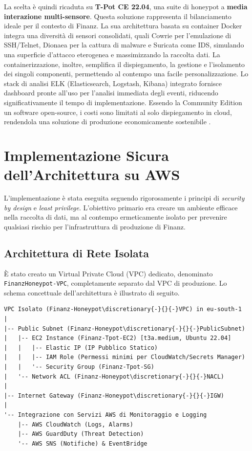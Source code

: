 La scelta è quindi ricaduta su \textbf{T-Pot CE 22.04}, una suite di honeypot a \textbf{media interazione multi-sensore}. Questa soluzione rappresenta il bilanciamento ideale per il contesto di Finanz. La sua architettura basata su container Docker integra una diversità di sensori consolidati, quali Cowrie per l'emulazione di SSH/Telnet, Dionaea per la cattura di malware e Suricata come IDS, simulando una superficie d'attacco eterogenea e massimizzando la raccolta dati. La containerizzazione, inoltre, semplifica il dispiegamento, la gestione e l'isolamento dei singoli componenti, permettendo al contempo una facile personalizzazione. Lo stack di analisi ELK (Elasticsearch, Logstash, Kibana) integrato fornisce dashboard pronte all'uso per l'analisi immediata degli eventi, riducendo significativamente il tempo di implementazione. Essendo la Community Edition un software open-source, i costi sono limitati al solo dispiegamento in cloud, rendendola una soluzione di produzione economicamente sostenibile \cite{proofpoint2024}.

\section{Implementazione Sicura dell'Architettura su AWS}
\label{sec:implementazione_sicura_aws}

L'implementazione è stata eseguita seguendo rigorosamente i principi di \textit{security by design} e \textit{least privilege}. L'obiettivo primario era creare un ambiente efficace nella raccolta di dati, ma al contempo ermeticamente isolato per prevenire qualsiasi rischio per l'infrastruttura di produzione di Finanz.

\subsection{Architettura di Rete Isolata}
È stato creato un Virtual Private Cloud (VPC) dedicato, denominato \texttt{Finanz\discretionary{-}{}{-}Honeypot\discretionary{-}{}{-}-VPC}, completamente separato dal VPC di produzione.
Lo schema concettuale dell'architettura è illustrato di seguito.

\begin{verbatim}
VPC Isolato (Finanz-Honeypot\discretionary{-}{}{-}VPC) in eu-south-1
|
|-- Public Subnet (Finanz-Honeypot\discretionary{-}{}{-}PublicSubnet)
|   |-- EC2 Instance (Finanz-Tpot-EC2) [t3a.medium, Ubuntu 22.04]
|   |   |-- Elastic IP (IP Pubblico Statico)
|   |   |-- IAM Role (Permessi minimi per CloudWatch/Secrets Manager)
|   |   '-- Security Group (Finanz-Tpot-SG)
|   '-- Network ACL (Finanz-Honeypot\discretionary{-}{}{-}NACL)
|
|-- Internet Gateway (Finanz-Honeypot\discretionary{-}{}{-}IGW)
|
'-- Integrazione con Servizi AWS di Monitoraggio e Logging
    |-- AWS CloudWatch (Logs, Alarms)
    |-- AWS GuardDuty (Threat Detection)
    '-- AWS SNS (Notifiche) & EventBridge
\end{verbatim}

